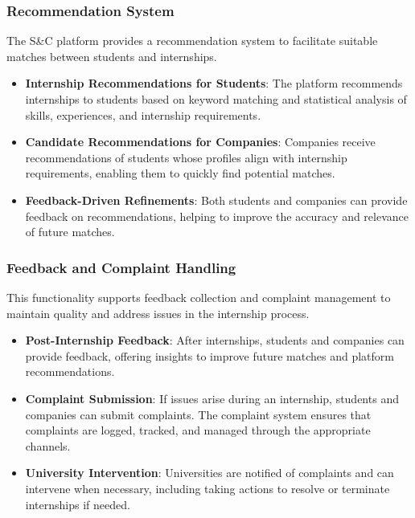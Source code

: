 \subsubsection*{Recommendation System} 
The S\&C platform provides a recommendation system to facilitate suitable matches between students and internships.
\begin{itemize}
    \item \textbf{Internship Recommendations for Students}: The platform recommends internships to students based on keyword matching and statistical analysis of skills, experiences, and internship requirements.
    \item \textbf{Candidate Recommendations for Companies}: Companies receive recommendations of students whose profiles align with internship requirements, enabling them to quickly find potential matches.
    \item \textbf{Feedback-Driven Refinements}: Both students and companies can provide feedback on recommendations, helping to improve the accuracy and relevance of future matches.
\end{itemize}

\subsubsection*{Feedback and Complaint Handling} 
This functionality supports feedback collection and complaint management to maintain quality and address issues in the internship process.
\begin{itemize}
    \item \textbf{Post-Internship Feedback}: After internships, students and companies can provide feedback, offering insights to improve future matches and platform recommendations.
    \item \textbf{Complaint Submission}: If issues arise during an internship, students and companies can submit complaints. The complaint system ensures that complaints are logged, tracked, and managed through the appropriate channels.
    \item \textbf{University Intervention}: Universities are notified of complaints and can intervene when necessary, including taking actions to resolve or terminate internships if needed.
\end{itemize}

